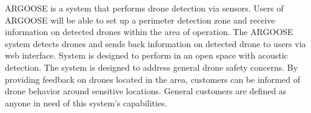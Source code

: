 ARGOOSE is a system that performs drone detection via sensors. Users of ARGOOSE will be able to set up a perimeter detection zone and receive information on detected drones within the area of operation.  The ARGOOSE system detects drones and sends back information on detected drone to users via web interface. System is designed to perform in an open space with acoustic detection.  The system is designed to address general drone safety concerns. By providing feedback on drones located in the area, customers can be informed of drone behavior around sensitive locations.  General customers are defined as anyone in need of this system's capabilities.